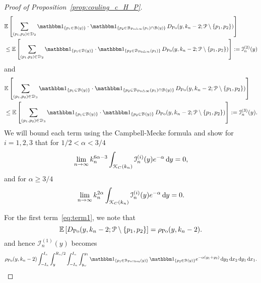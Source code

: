 \begin{proof}[Proof of Proposition~\ref{prop:couling_c_H_P}]
\begin{equation} \label{eq:term2}
\begin{split}
	&\Exp{\sum_{(p_1, p_2)\in \dom{2}} \ind{p_1 \in \BallHyp{y}} \cdot \ind{p_2 \in \BallSym{p_1}\cap \BallHyp{y}} 
		\, D_{\Po} (y,k_n-2;\Pcal \setminus \{p_1,p_2\})} \\
	&\le \Exp{\sum_{(p_1, p_2)\in \dom{2}} \ind{p_1 \in \BallHyp{y}} \cdot \ind{p_2 \in \BallSym{p_1}} 
		\, D_{\Po} (y,k_n-2;\Pcal \setminus \{p_1,p_2\})} := \mathcal{I}_n^{(2)}(y)
\end{split}
\end{equation}
and 
\begin{equation}\label{eq:term3}
\begin{split}
	&\Exp{\sum_{(p_1, p_2)\in \dom{3}} \ind{p_1 \in \BallHyp{y}} \cdot \ind{p_2 \in \BallSym{p_1}\cap \BallHyp{y}} 
		\, D_{\Po} (y,k_n-2;\Pcal \setminus \{p_1,p_2\})} \\
	&\le \Exp{\sum_{(p_1, p_2)\in \dom{3}} \ind{p_1 \in \BallHyp{y}} \cdot \ind{p_2 \in \BallHyp{y}} 
		\, D_{\Po} (y,k_n-2;\Pcal \setminus \{p_1,p_2\})} := \mathcal{I}_n^{(3)}(y).
\end{split}
\end{equation}
We will bound each term using the Campbell-Mecke formula and show for $i = 1,2,3$ that for $1/2 < \alpha < 3/4$
\begin{equation}
	\lim_{n \to \infty} k_n^{6\alpha -3} 
		\int_{{\mathcal K}_{C}(k_n)} \mathcal{I}_n^{(i)}(y) e^{-\alpha} \operatorname{\mathrm{d}\hspace{-2pt}} y = 0,
\end{equation}
and for $\alpha \ge 3/4$
\begin{equation}
	\lim_{n \to \infty} k_n^{2\alpha}
		\int_{{\mathcal K}_{C}(k_n)} \mathcal{I}_n^{(i)}(y) e^{-\alpha} \operatorname{\mathrm{d}\hspace{-2pt}} y = 0.
\end{equation}

For the first term~\eqref{eq:term1}, we note that
\[ 
\mathbb{E}\left[D_{{\mathrm{Po}}}(y, k_n-2;{\mathcal P} \setminus \{p_1, p_2\}\right] =\rho_{{\mathrm{Po}}}(y,k_n-2).
\] 
and hence $\mathcal{I}_n^{(1)}(y)$ becomes
\begin{equation} \label{eq:1sum-expansion} 
\begin{split}
	\rho_{\Po}(y,k_n-2) \int_{-I_n}^{I_n} \int_y^{R_n/2}\int_{-I_n}^{I_n} \int_{y_\omega}^{y_1}
  	\ind{p_1 \in \BallInter{y}} \, \ind{p_2 \in \BallHyp{y}} 
  	e^{-\alpha (y_1 + y_2)} \dd y_2 \dd x_2 \dd y_1 \dd x_1.
\end{split}
\end{equation}


\end{proof}
